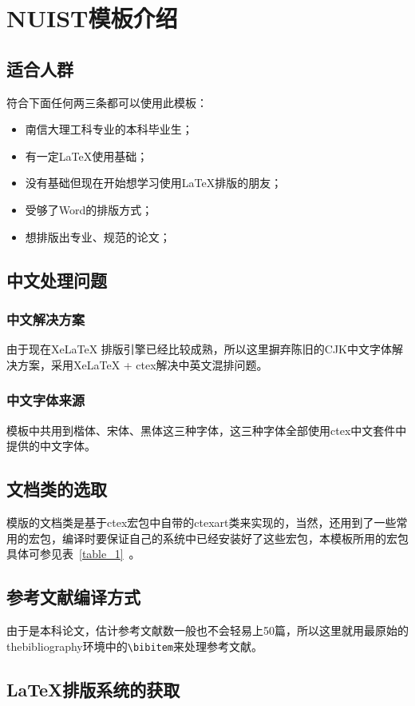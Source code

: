 \section{NUIST模板介绍}

\subsection{适合人群}
符合下面任何两三条都可以使用此模板：
\begin{itemize}
\item 南信大理工科专业的本科毕业生；
\item 有一定\LaTeX 使用基础；
\item 没有基础但现在开始想学习使用\LaTeX 排版的朋友；
\item 受够了Word的排版方式；
\item 想排版出专业、规范的论文；
\end{itemize}
\subsection{中文处理问题}

\subsubsection{中文解决方案}
由于现在XeLaTeX 排版引擎已经比较成熟，所以这里摒弃陈旧的CJK中文字体解决方案，采用XeLaTeX + ctex解决中英文混排问题。
\subsubsection{中文字体来源}
模板中共用到楷体、宋体、黑体这三种字体，这三种字体全部使用ctex中文套件中提供的中文字体。
\subsection{文档类的选取}

模版的文档类是基于ctex宏包中自带的ctexart类来实现的，当然，还用到了一些常用的宏包，编译时要保证自己的系统中已经安装好了这些宏包，本模板所用的宏包具体可参见表~\ref{table_1}~。

\subsection{参考文献编译方式}

由于是本科论文，估计参考文献数一般也不会轻易上50篇，所以这里就用最原始的thebibliography环境中的\verb|\bibitem|来处理参考文献。

\subsection{\LaTeX 排版系统的获取}


